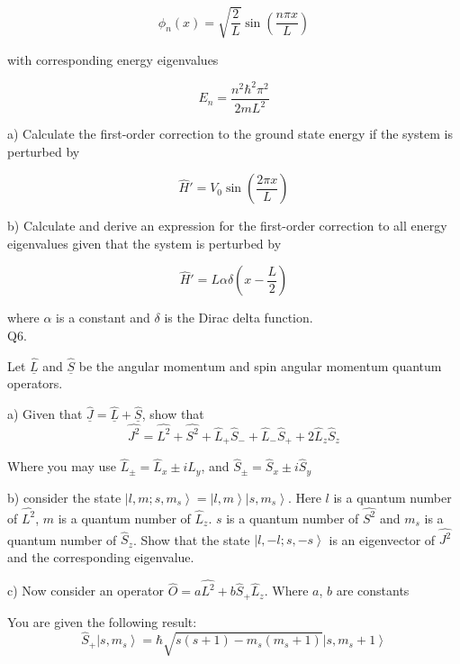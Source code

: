 \documentclass[a4paper,11pt]{article}
\begin{document}
\[ \phi_{n}(x) = \sqrt{\frac{2}{L}} \sin\left(\frac{n \pi x}{L} \right) \]

with corresponding energy eigenvalues 

\[ E_{n} = \frac{n^{2}\hbar^{2}\pi^{2}}{2mL^{2}} \]

a) Calculate the first-order correction to the ground state energy if the system is perturbed by 

\[ \hat{H}' = V_{0} \sin\left(\frac{2 \pi x}{L} \right) \]

\medskip

b) Calculate and derive an expression for the first-order correction to all energy eigenvalues given that the system is perturbed by 

\[ \hat{H}' = L\alpha \delta\left(x - \frac{L}{2} \right) \]

where \( \alpha \) is a constant and \( \delta \) is the Dirac delta function.\\ 

Q6. 

Let \( \hat{\underline{L}} \) and \( \hat{\underline{S}} \) be the angular momentum and spin angular momentum quantum operators. 

\medskip

a) Given that \( \hat{\underline{J}} = \hat{\underline{L}} + \hat{\underline{S}} \), show that 
\[ \hat{J^{2}} =  \hat{L^{2}} + \hat{S^{2}} + \hat{L}_{+}\hat{S}_{-} +  \hat{L}_{-}\hat{S}_{+} + 2\hat{L}_{z}\hat{S}_{z} \]

Where you may use  \( \hat{L}_{\pm} = \hat{L}_{x} \pm i\hat{L}_{y} \), and \( \hat{S}_{\pm} = \hat{S}_{x} \pm i\hat{S}_{y} \)

\medskip

b) consider the state \( \left|l, m; s, m_{s} \right> = \left|l, m \right>\left|s, m_{s} \right> \). Here \( l \) is a quantum number of \( \hat{L^{2}} \), \( m \) is a quantum number of \( \hat{L}_{z} \). \( s \) is a quantum number of \( \hat{S^{2}} \) and \( m_{s} \) is a quantum number of \( \hat{S}_{z} \). Show that the state \( \left|l, -l; s, -s \right> \) is an eigenvector of \( \hat{J^{2}} \) and the corresponding eigenvalue. 

\medskip

c) Now consider an operator \( \hat{O} = a\hat{L^{2}} + b\hat{S}_{+}\hat{L}_{z} \). Where \( a \), \( b \) are constants

You are given the following result:
\[ \hat{S}_{+} \left|s, m_{s} \right> = \hbar \sqrt{s(s+1) - m_{s}(m_{s}+1)} \left|s, m_{s}+1 \right> \]
\end{document}

